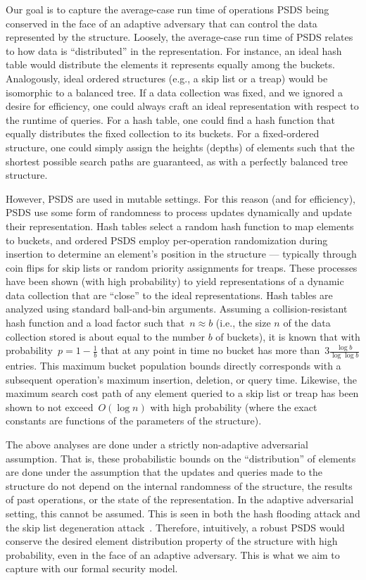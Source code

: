 Our goal is to capture the average-case run time of operations PSDS being conserved in the face of an adaptive adversary that can control the data represented by the structure. Loosely, the average-case run time of PSDS relates to how data is ``distributed'' in the representation.  For instance, an ideal hash table would distribute the elements it represents equally among the buckets. Analogously, ideal ordered structures (e.g., a skip list or a treap) would be isomorphic to a balanced tree. If a data collection was fixed, and we ignored a desire for efficiency, one could always craft an ideal representation with respect to the runtime of queries. For a hash table, one could find a hash function that equally distributes the fixed collection to its buckets. For a fixed-ordered structure, one could simply assign the heights (depths) of elements such that the shortest possible search paths are guaranteed, as with a perfectly balanced tree structure. 

However, PSDS are used in mutable settings. For this reason (and for efficiency), PSDS use some form of randomness to process updates dynamically and update their representation. Hash tables select a random hash function to map elements to buckets, and ordered PSDS employ per-operation randomization during insertion to determine an element's position in the structure --- typically through coin flips for skip lists or random priority assignments for treaps. These processes have been shown (with high probability) to yield representations of a dynamic data collection that are ``close'' to the ideal representations. Hash tables are analyzed using standard ball-and-bin arguments. Assuming a collision-resistant hash function and a load factor such that~$n \approx b$ (i.e., the size $n$ of the data collection stored is about equal to the number $b$ of buckets), it is known \cite{chawla09} that with probability~$p = 1 - \frac{1}{b}$ that at any point in time no bucket has more than~$3\frac{\log b}{\log \log b}$ entries. This maximum bucket population bounds directly corresponds with a subsequent operation's maximum insertion, deletion, or query time. Likewise, the maximum search cost path of any element queried to a skip list or treap has been shown to not exceed~$O (\log n)$ with high probability (where the exact constants are functions of the parameters of the structure).  

The above analyses are done under a strictly non-adaptive adversarial assumption. That is, these probabilistic bounds on the ``distribution'' of elements are done under the assumption that the updates and queries made to the structure do not depend on the internal randomness of the structure, the results of past operations, or the state of the representation. In the adaptive adversarial setting, this cannot be assumed. This is seen in both the hash flooding attack and the skip list degeneration attack~\cite{CrosbyW03,bar2007remote,klink2011efficient,nussbaum2019skiplist}. 
Therefore, intuitively, a robust PSDS would conserve the desired element distribution property of the structure with high probability, even in the face of an adaptive adversary. This is what we aim to capture with our formal security model.

